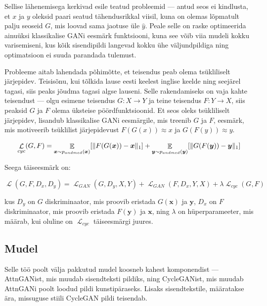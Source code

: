 \documentclass{vilgym}
\DeclareMathOperator{\EX}{\mathbb{E}}
\DeclareMathOperator{\loss}{\mathcal{L}}
\DeclarePairedDelimiter{\norm}{\lVert}{\rVert}
\begin{document}
	Sellise lähenemisega kerkivad esile teatud probleemid --- antud seos ei kindlusta, et $ x $ ja $ y $ oleksid paari seatud tähendusrikkal viisil, kuna on olemas lõpmatult palju seoseid $ G $, mis loovad sama jaotuse üle $ \hat{y} $. Peale selle on raske optimeerida ainuüksi klassikalise GANi eesmärk funktsiooni, kuna see võib viia mudeli kokku varisemiseni, kus kõik sisendipildi langevad kokku ühe väljundpildiga ning optimatsioon ei suuda parandada tulemust.

	Probleeme aitab lahendada põhimõtte, et teisendus peab olema tsükliliselt järjepidev. Teisisõnu, kui tõlkida lause eesti keelest inglise keelde ning seejärel tagasi, siis peaks jõudma tagasi algse lauseni. Selle rakendamiseks on vaja kahte teisendust --- olgu esimene teisendus $ G: X \rightarrow Y $ ja teine teisendus $F: Y \rightarrow X $, siis peaksid $ G $ ja $ F $ olema üksteise pöördfunktsioonid. Et seos oleks tsükliliselt järjepidev, lisandub klassikalise GANi eesmärgile, mis treenib $ G $ ja $ F $, eesmärk, mis motiveerib tsüklilist järjepidevust $ F(G(x)) \approx x $ ja $ G(F(y)) \approx y $.

	\begin{equation}
		\loss_{cyc}(G,F) = \EX_{\boldsymbol{x}\sim p_{andmed}(\boldsymbol{x})}[\norm{F(G(\boldsymbol{x})) - \boldsymbol{x}}_1] + \EX_{\boldsymbol{y}\sim p_{andmed}(\boldsymbol{y})}[\norm{G(F(\boldsymbol{y})) - \boldsymbol{y}}_1]
	\end{equation}

	Seega täiseesmärk on:

	\begin{equation}
		\loss(G, F, D_x, D_y) = \loss_{GAN}(G, D_y, X, Y) + \loss_{GAN}(F, D_x, Y, X) + \lambda \loss_{cyc}(G, F)
	\end{equation}

	kus $ D_y $ on $ G $ diskriminaator, mis proovib eristada $ G(\boldsymbol{x}) $ ja $ \boldsymbol{y} $, $ D_x $ on  $ F $ diskriminaator, mis proovib eristada $ F(\boldsymbol{y}) $ ja $ \boldsymbol{x} $, ning $ \lambda $ on hüperparameeter, mis määrab, kui oluline on $ \loss_{cyc} $ täiseesmärgi juures.

	\subsection{Mudel}
	Selle töö poolt välja pakkutud mudel koosneb kahest komponendist --- AttnGANist, mis muudab sisendteksti pildiks, ning CycleGANist, mis muudab AttnGANi poolt loodud pildi kunstipäraseks. Lisaks sisendtekstile, määratakse ära, missuguse stiili CycleGAN pildi teisendab.
\end{document}
